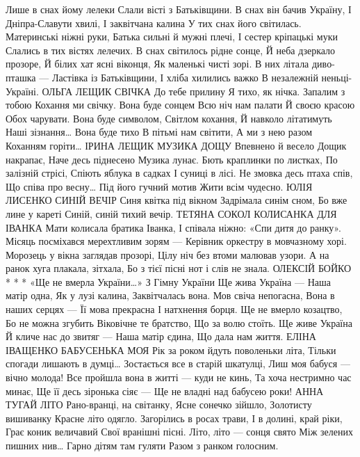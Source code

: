 Лише в снах йому лелеки
Слали вісті з Батьківщини.
В снах він бачив Україну,
І Дніпра-Славути хвилі,
І заквітчана калина
У тих снах його світилась.
Материнські ніжні руки,
Батька сильні й мужні плечі,
І сестер кріпацькі муки
Слались в тих вістях лелечих.
В снах світилось рідне сонце,
Й неба дзеркало прозоре,
Й білих хат ясні віконця,
Як маленькі чисті зорі.
В них літала диво-пташка —
Ластівка із Батьківщини,
І хліба хилились важко
В незалежній неньці-Україні.
ОЛЬГА ЛЕЩИК
СВІЧКА
До тебе прилину
Я тихо, як нічка.
Запалим з тобою
Кохання ми свічку.
Вона буде сонцем
Всю ніч нам палати
Й своєю красою
Обох чарувати.
Вона буде символом,
Світлом кохання,
Й навколо літатимуть
Наші зізнання…
Вона буде тихо
В пітьмі нам світити,
А ми з нею разом
Коханням горіти…
ІРИНА ЛЕЩИК
МУЗИКА ДОЩУ
Впевнено й весело
Дощик накрапає,
Наче десь піднесено
Музика лунає.
Бють краплинки по листках,
По залізній стрісі,
Спіють яблука в садках
І суниці в лісі.
Не змовка десь птаха спів,
Що співа про весну…
Під його гучний мотив
Жити всім чудесно.
ЮЛІЯ ЛИСЕНКО
СИНІЙ ВЕЧІР
Синя квітка під вікном
Задрімала синім сном,
Бо вже лине у кареті
Синій, синій тихий вечір.
ТЕТЯНА СОКОЛ
КОЛИСАНКА ДЛЯ ІВАНКА
Мати колисала братика Іванка, 
І співала ніжно: «Спи дитя до ранку».
Місяць посміхався мерехтливим зорям —
Керівник оркестру в мовчазному хорі.
Морозець у вікна заглядав прозорі,
Цілу ніч без втоми малював узори.
А на ранок хуга плакала, зітхала,
Бо з тієї пісні нот і слів не знала.
ОЛЕКСІЙ БОЙКО
* * *
«Ще не вмерла України…»
З Гімну України
Ще жива Україна — 
Наша матір одна,
Як у лузі  калина,
Заквітчалась вона.
Мов свіча непогасна,  
Вона в наших серцях — 
Її мова прекрасна
І натхнення борця.
Ще не вмерло козацтво,
Бо не можна згубить 
Віковічне те братство,
Що за волю стоїть.
Ще живе Україна 
Й кличе нас до звитяг —  
Наша матір єдина,
Що дала нам життя.
ЕЛІНА ІВАЩЕНКО
БАБУСЕНЬКА МОЯ
Рік за роком йдуть поволеньки літа,
Тільки спогади лишають в думці…
Зостається все  в старій шкатулці,
Лиш моя бабуся — вічно молода!
Все пройшла вона в житті — куди не кинь,
Та хоча нестримно час  минає,
Ще її десь зіронька сіяє —
Ще не владні над бабусею роки!
АННА ТУГАЙ
ЛІТО
Рано-вранці, на світанку,
Ясне сонечко зійшло,
Золотисту вишиванку
Красне літо одягло.
Загорілись в росах трави,
І в долині, край ріки,
Грає коник величавий
Свої вранішні пісні.
Літо, літо — сонця свято 
Між зелених пишних нив…
Гарно дітям там гуляти
Разом з ранком голосним.
